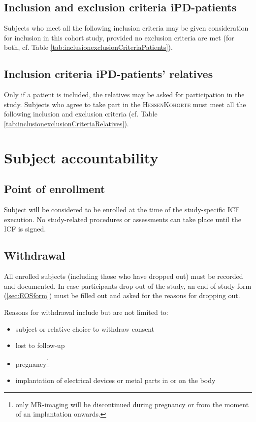 \subsection{Inclusion and exclusion criteria \ac{iPD}-patients}
\label{sec:inclusion_criteriaIPS}
Subjects who meet all the following inclusion criteria may be given consideration for inclusion in this cohort study, provided no exclusion criteria are met (for both, cf. Table \ref{tab:inclusionexclusionCriteriaPatients}).


\subsection{Inclusion criteria \ac{iPD}-patients' relatives}
\label{sec:inclusion_criteriaREL}
Only if a patient is included, the relatives may be asked for participation in the study. Subjects who agree to take part in the \textsc{HessenKohorte} must meet all the following inclusion and exclusion criteria (cf. Table  \ref{tab:inclusionexclusionCriteriaRelatives}).


\section{Subject accountability}
\subsection{Point of enrollment}
Subject will be considered to be enrolled at the time of the study-specific \ac{ICF} execution. No study-related procedures or assessments can take place until the \ac{ICF} is signed.

\subsection{Withdrawal}
All enrolled subjects (including those who have dropped out) must be recorded and documented. In case participants drop out of the study, an end-of-study form (\ref{sec:EOSform}) must be filled out and asked for the reasons for dropping out. 

Reasons for withdrawal include but are not limited to:
\begin{itemize}
  \item subject or relative choice to withdraw consent
  \item lost to follow-up
  \item pregnancy\footnote{\label{note1} only MR-imaging will be discontinued during pregnancy or from the moment of an implantation onwards.}
  \item implantation of electrical devices or metal parts in or on the body
\end{itemize}

